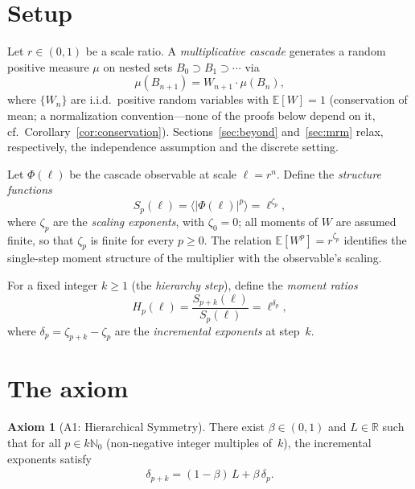 \documentclass[12pt]{amsart}
\theoremstyle{definition}
\newtheorem*{axiom}{Axiom}
\theoremstyle{remark}
\begin{document}
\section{Setup}
\label{sec:setup}

Let $r \in (0,1)$ be a scale ratio.  A \emph{multiplicative cascade}
generates a random positive measure $\mu$ on nested sets $B_0 \supset
B_1 \supset \cdots$ via
\[
  \mu(B_{n+1}) = W_{n+1} \cdot \mu(B_n),
\]
where $\{W_n\}$ are i.i.d.\ positive random variables with
$\mathbb{E}[W] = 1$ (conservation of mean; a normalization
convention---none of the proofs below depend on it, cf.\
Corollary~\ref{cor:conservation}).  Sections~\ref{sec:beyond}
and~\ref{sec:mrm} relax, respectively, the independence assumption
and the discrete setting.

Let $\Phi(\ell)$ be the cascade observable at scale $\ell = r^n$.
Define the \emph{structure functions}
\[
  S_p(\ell) = \langle |\Phi(\ell)|^p \rangle = \ell^{\zeta_p},
\]
where $\zeta_p$ are the \emph{scaling exponents}, with $\zeta_0 = 0$;
all moments of $W$ are assumed finite, so that $\zeta_p$ is finite
for every $p \ge 0$.  The relation $\mathbb{E}[W^p] = r^{\zeta_p}$
identifies the single-step moment structure of the multiplier with
the observable's scaling.

For a fixed integer $k \geq 1$ (the \emph{hierarchy step}), define
the \emph{moment ratios}
\[
  H_p(\ell) = \frac{S_{p+k}(\ell)}{S_p(\ell)} = \ell^{\delta_p},
\]
where $\delta_p = \zeta_{p+k} - \zeta_p$ are the \emph{incremental
exponents} at step~$k$.


\section{The axiom}
\label{sec:axiom}

\begin{axiom}[A1: Hierarchical Symmetry]
There exist $\beta \in (0,1)$ and $L \in \mathbb{R}$ such that for
all $p \in k\mathbb{N}_0$ (non-negative integer multiples of~$k$),
the incremental exponents satisfy
\begin{align}\label{eq:A1}
  \delta_{p+k}
  = (1 - \beta)\,L + \beta\,\delta_p.
  \tag{$*$}
\end{align}
\end{axiom}
\end{document}
